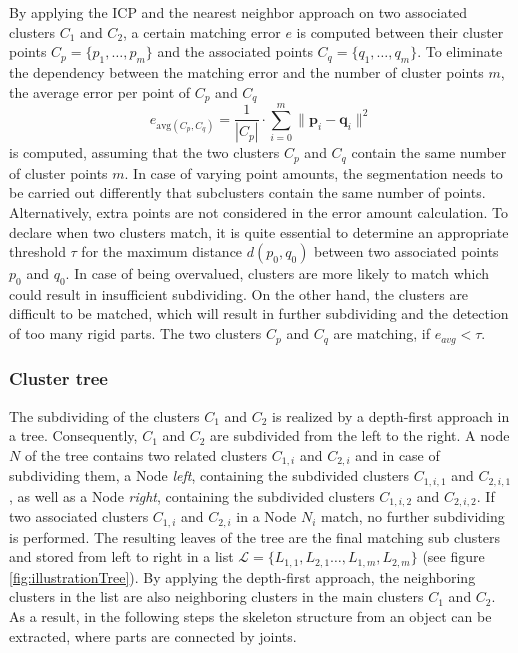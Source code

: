 By applying the ICP and the nearest neighbor approach on two associated clusters $C_1$ and $C_2$, a certain matching error $e$ is computed between their cluster points $ C_p =  \{ p_1, \ldots, p_m\}$ and the associated points $ C_q =  \{ q_1, \ldots, q_m\}$. To eliminate the dependency between the matching error and the number of cluster points $m$, the average error per point of $C_p$ and $C_q$
%
\begin{equation}
	e_{\mathrm{avg}(C_p, C_q)} = \frac{1}{| C_p |} \cdot \displaystyle\sum_{i=0}^{m}\| \boldsymbol{p}_i - \boldsymbol{q}_i\|^2
\end{equation}
%
is computed, assuming that the two clusters $C_p$ and $C_q$ contain the same number of cluster points $m$. In case of varying point amounts, the segmentation needs to be carried out differently that subclusters contain the same number of points. Alternatively, extra points are not considered in the error amount calculation. To declare when two clusters match, it is quite essential to determine an appropriate threshold $\tau$ for the maximum distance $d(p_0, q_0)$ between two associated points $p_0$ and $q_0$. In case of being overvalued, clusters are more likely to match which could result in insufficient subdividing. On the other hand, the clusters are difficult to be matched, which will result in further subdividing and the detection of too many rigid parts. The two clusters $C_p$ and $C_q$ are matching, if $e_{avg} < \tau$.

\subsubsection{Cluster tree}
\label{tree}

The subdividing of the clusters $C_1$ and $C_2$ is realized by a depth-first approach in a tree. Consequently, $C_1$ and $C_2$ are subdivided from the left to the right. A node $N$ of the tree contains two related clusters $C_{1,i}$ and $C_{2,i}$ and in case of subdividing them, a Node \textit{left}, containing the subdivided clusters $C_{1,i,1}$ and $C_{2,i,1}$, as well as a Node \textit{right}, containing the subdivided clusters $C_{1,i,2}$ and $C_{2,i,2}$. If two associated clusters $C_{1,i}$ and $C_{2,i}$ in a Node $N_i$ match, no further subdividing is performed. The resulting leaves of the tree are the final matching sub clusters and stored from left to right in a list $\mathcal{L} = \{L_{1,1},L_{2,1}\ldots,L_{1,m},L_{2,m}\}$ (see figure \ref{fig:illustrationTree}). By applying the depth-first approach, the neighboring clusters in the list are also neighboring clusters in the main clusters $C_1$ and $C_2$.  As a result, in the following steps the skeleton structure from an object can be extracted, where parts are connected by joints.

